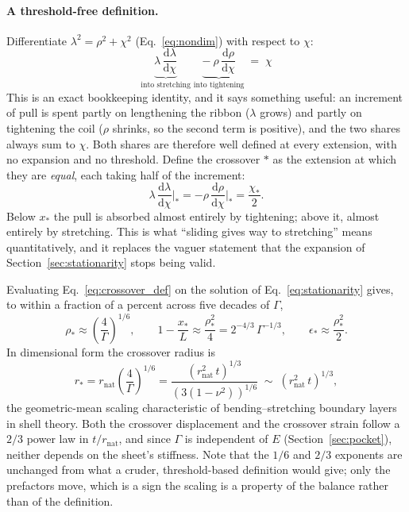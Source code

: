 \documentclass[11pt]{article}
\begin{document}
\paragraph{A threshold-free definition.} Differentiate
$\lambda^{2} = \rho^{2} + \chi^{2}$ (Eq.~\ref{eq:nondim}) with respect to $\chi$:
\begin{equation}\label{eq:budget}
    \boxed{\;\underbrace{\lambda\,\frac{\mathrm d \lambda}{\mathrm d \chi}}
      _{\text{into stretching}}
    \;\underbrace{-\ \rho\,\frac{\mathrm d \rho}{\mathrm d \chi}}
      _{\text{into tightening}}
    \;=\; \chi \;}
\end{equation}
This is an exact bookkeeping identity, and it says something useful: an increment
of pull is spent partly on lengthening the ribbon ($\lambda$ grows) and partly on
tightening the coil ($\rho$ shrinks, so the second term is positive), and the two
shares always sum to $\chi$. Both shares are therefore well defined at every
extension, with no expansion and no threshold. Define the crossover $*$ as the
extension at which they are \emph{equal}, each taking half of the increment:
\begin{equation}\label{eq:crossover_def}
    \lambda\,\frac{\mathrm d \lambda}{\mathrm d \chi}\bigg|_{*}
      = -\rho\,\frac{\mathrm d \rho}{\mathrm d \chi}\bigg|_{*}
      = \frac{\chi_*}{2} .
\end{equation}
Below $x_*$ the pull is absorbed almost entirely by tightening; above it, almost
entirely by stretching. This is what ``sliding gives way to stretching'' means
quantitatively, and it replaces the vaguer statement that the expansion of
Section~\ref{sec:stationarity} stops being valid.

Evaluating Eq.~\eqref{eq:crossover_def} on the solution of
Eq.~\eqref{eq:stationarity} gives, to within a fraction of a percent across five
decades of $\Gamma$,
\begin{equation}\label{eq:rho_star}
    \boxed{\;\rho_* \approx \left(\frac{4}{\Gamma}\right)^{1/6},
    \qquad
    1 - \frac{x_*}{L} \approx \frac{\rho_*^{2}}{4}
      = 2^{-4/3}\,\Gamma^{-1/3},
    \qquad
    \epsilon_* \approx \frac{\rho_*^{2}}{2} .\;}
\end{equation}
In dimensional form the crossover radius is
\begin{equation}\label{eq:r_star_dim}
    r_* = r_{\mathrm{nat}}\left(\frac{4}{\Gamma}\right)^{1/6}
      = \frac{\left(r_{\mathrm{nat}}^{2}\,t\right)^{1/3}}
        {\left(3\left(1-\nu^{2}\right)\right)^{1/6}}
    \;\sim\; \left(r_{\mathrm{nat}}^{2}\,t\right)^{1/3},
\end{equation}
the geometric-mean scaling characteristic of bending--stretching boundary layers
in shell theory. Both the crossover displacement and the crossover strain follow
a $2/3$ power law in $t/r_{\mathrm{nat}}$, and since $\Gamma$ is independent of
$E$ (Section~\ref{sec:pocket}), neither depends on the sheet's stiffness. Note
that the $1/6$ and $2/3$ exponents are unchanged from what a cruder,
threshold-based definition would give; only the prefactors move, which is a sign
the scaling is a property of the balance rather than of the definition.
\end{document}

